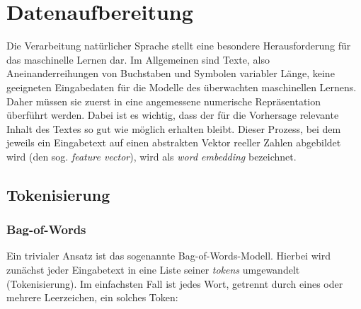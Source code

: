 
\section{Datenaufbereitung}\label{sec:datenaufbereitung}

Die Verarbeitung natürlicher Sprache stellt eine besondere Herausforderung für das maschinelle Lernen dar. Im Allgemeinen sind Texte, also Aneinanderreihungen von Buchstaben und Symbolen variabler Länge, keine geeigneten Eingabedaten für die Modelle des überwachten maschinellen Lernens. Daher müssen sie zuerst in eine angemessene numerische Repräsentation überführt werden. Dabei ist es wichtig, dass der für die Vorhersage relevante Inhalt des Textes so gut wie möglich erhalten bleibt. Dieser Prozess, bei dem jeweils ein Eingabetext auf einen abstrakten Vektor reeller Zahlen abgebildet wird (den sog. \textit{feature vector}), wird als \textit{word embedding} bezeichnet. 

\subsection{Tokenisierung}

\subsubsection{Bag-of-Words}
Ein trivialer Ansatz ist das sogenannte Bag-of-Words-Modell. Hierbei wird zunächst jeder Eingabetext in eine Liste seiner \textit{tokens} umgewandelt (Tokenisierung). Im einfachsten Fall ist jedes Wort, getrennt durch eines oder mehrere Leerzeichen, ein solches Token:

\begin{figure}[H]
    \centering
    \caption{}
    \label{fig:tokenize_words}
\end{figure}

